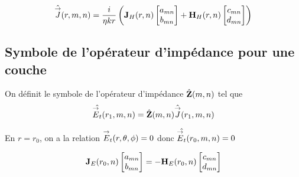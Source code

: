         \begin{equation}
            \hat{\vJ}(r,m,n) = \frac{i}{\eta k r}
            \left(
            \mJ_{H}(r,n)
            \begin{bmatrix}
                a_{mn}
                \\
                b_{mn}
            \end{bmatrix}
            + 
            \mH_{H}(r,n)
            \begin{bmatrix}
                c_{mn}
                \\
                d_{mn}
            \end{bmatrix}
            \right)
        \end{equation}

    \subsection{Symbole de l'opérateur d'impédance pour une couche}

        \begin{figure}[!hbt]
          \centering
          \begin{tikzpicture}
            
          \end{tikzpicture}
        \end{figure}

        \begin{defn}
          On définit le symbole de l'opérateur d'impédance \(\hat{\mZ}(m,n)\) tel que 
          \[
              \hat{\vE_t}(r_1,m,n) = \hat{\mZ}(m,n)\hat{\vJ}(r_1,m,n)
          \]
        \end{defn}

        En \(r=r_0\), on a la relation \(\vE_t(\rtp) = 0\) donc \(\hat{\vE_t}(r_0,m,n) = 0 \)

        \begin{equation}
            \mJ_{E}(r_0,n)
            \begin{bmatrix}
                a_{mn}
                \\
                b_{mn}
            \end{bmatrix}
            = - 
            \mH_{E}(r_0,n)
            \begin{bmatrix}
                c_{mn}
                \\
                d_{mn}
            \end{bmatrix}
        \end{equation}

